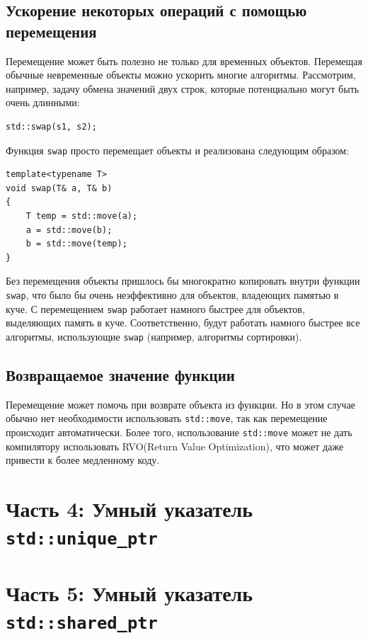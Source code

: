 \documentclass{article}
\begin{document}
\subsection*{Ускорение некоторых операций с помощью перемещения}
Перемещение может быть полезно не только для временных объектов. Перемещая обычные невременные объекты можно ускорить многие алгоритмы. Рассмотрим, например, задачу обмена значений двух строк, которые потенциально могут быть очень длинными:
\begin{lstlisting}
std::swap(s1, s2);
\end{lstlisting}
Функция \texttt{swap} просто перемещает объекты и реализована следующим образом:
\begin{lstlisting}
template<typename T> 
void swap(T& a, T& b) 
{
    T temp = std::move(a);
    a = std::move(b);
    b = std::move(temp);
}
\end{lstlisting}
Без перемещения объекты пришлось бы многократно копировать внутри функции \texttt{swap}, что было бы очень неэффективно для объектов, владеющих памятью в куче. С перемещением \texttt{swap} работает намного быстрее для объектов, выделяющих память в куче. Соответственно, будут работать намного быстрее все алгоритмы, использующие \texttt{swap} (например, алгоритмы сортировки).

\subsection*{Возвращаемое значение функции}
Перемещение может помочь при возврате объекта из функции. Но в этом случае обычно нет необходимости использовать \texttt{std::move}, так как перемещение происходит автоматически. Более того, использование \texttt{std::move} может не дать компилятору использовать RVO(Return Value Optimization), что может даже привести к более медленному коду.


\newpage
\section*{Часть 4: Умный указатель \texttt{std::unique\_ptr}}

\newpage
\section*{Часть 5: Умный указатель \texttt{std::shared\_ptr}}
\end{document}
